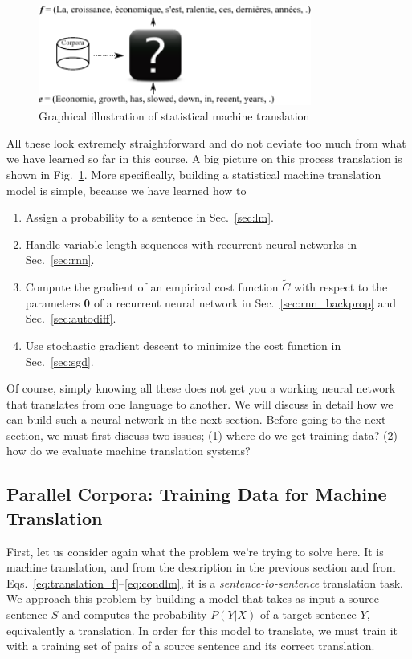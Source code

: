\documentclass{report}
\newcommand{\vects}[1]{\boldsymbol{#1}}
\newcommand{\TT}[0]{\vects{\theta}}
\begin{document}
\begin{figure}[t]
    \centering
    \includegraphics[width=0.8\textwidth]{figures/smt1.pdf}
    \caption{Graphical illustration of statistical machine translation}
    \label{fig:smt}
\end{figure}

All these look extremely straightforward and do not deviate too much from what
we have learned so far in this course. A big picture on this process translation
is shown in Fig.~\ref{fig:smt}.  More specifically, building a statistical
machine translation model is simple, because we have learned how to 
\begin{enumerate}
    \itemsep 0em
    \item Assign a probability to a sentence in
        Sec.~\ref{sec:lm}.
    \item Handle variable-length sequences with recurrent
        neural networks in Sec.~\ref{sec:rnn}.
    \item Compute the gradient of an empirical cost function $\tilde{C}$ with
        respect to the parameters $\TT$ of a recurrent neural network in
        Sec.~\ref{sec:rnn_backprop} and Sec.~\ref{sec:autodiff}.
    \item Use stochastic gradient descent to minimize the cost function in
        Sec.~\ref{sec:sgd}.
\end{enumerate}

Of course, simply knowing all these does not get you a working neural network
that translates from one language to another. We will discuss in detail how we
can build such a neural network in the next section. Before going to the next
section, we must first discuss two issues; (1) where do we get training data?
(2) how do we evaluate machine translation systems?

\subsection{Parallel Corpora: Training Data for Machine Translation}

First, let us consider again what the problem we're trying to solve here. It is
machine translation, and from the description in the previous section and from
Eqs.~\eqref{eq:translation_f}--\eqref{eq:condlm}, it is a {\em
sentence-to-sentence} translation task. We approach this problem by building a
model that takes as input a source sentence $S$ and computes the probability
$P(Y|X)$ of a target sentence $Y$, equivalently a translation. In order for this
model to translate, we must train it with a training set of pairs of a source
sentence and its correct translation.
\end{document}
